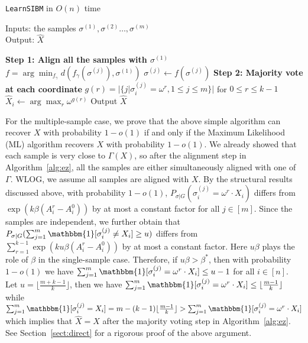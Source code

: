 \documentclass{article}
\begin{document}
\begin{center}
	\begin{minipage}{.55\textwidth}
		\begin{algorithm}[H]
			\caption{\texttt{LearnSIBM} in $O(n)$ time} \label{alg:ez}
			Inputs: the samples $\sigma^{(1)},\sigma^{(2)}\dots,\sigma^{(m)}$ \\
			Output: $\hat{X}$
			\begin{algorithmic}[1]
				\Statex \hspace*{-0.3in} 
				{\bf Step 1: Align all the samples with $\sigma^{(1)}$ }
				\State $f=\arg\min_{f_{\gamma}} d(f_{\gamma}(\sigma^{(j)}), \sigma^{(1)})$
				\State $\sigma^{(j)} \gets f(\sigma^{(j)})$
				\EndFor
				\Statex \hspace*{-0.3in}
				{\bf Step 2: Majority vote at each coordinate}
				\State $g(r) = |\{j | \sigma^{(j)}_i = \omega^r,1\leq j \leq m\}|$ for $ 0 \leq r \leq k-1$
				\State $\hat{X}_i \gets  \arg\max_r \omega^{g(r)}$
				\State {}
				\EndFor
				\State Output $\hat{X}$
			\end{algorithmic}
		\end{algorithm}
	\end{minipage}
\end{center}
For the multiple-sample case, we prove that the above simple algorithm can recover $X$ with probability $1-o(1)$ if and only if the Maximum Likelihood (ML) algorithm recovers $X$ with probability $1-o(1)$. We already showed that each sample is very close to $\Gamma(X)$, so after the alignment step in Algorithm~\ref{alg:ez}, all the samples are either simultaneously aligned with one of $\Gamma$. WLOG, we assume all samples are aligned with $X$.
By the structural results discussed above,
with probability $1-o(1)$, $P_{\sigma|G}(\sigma_i^{(j)} = \omega^r \cdot X_i)$ differs from
$\exp (k \beta (A^r_i-A^0_i))$ by at most a constant factor for all $j\in[m]$. Since the samples are independent, we further obtain that $P_{\sigma|G}(\sum_{j=1}^m\mathbbm{1}[\sigma_i^{(j)} \neq X_i]\ge u)$ differs from $\sum_{r=1}^{k-1} \exp (k u \beta (A^r_i-A^0_i))$
by at most a constant factor.
Here $u\beta$ plays the role of $\beta$ in the single-sample case.
Therefore, if $u\beta>\beta^\ast$, then with probability $1-o(1)$
we have $\sum_{j=1}^m\mathbbm{1}[\sigma_i^{(j)}= \omega^r \cdot X_i] \le u-1$ for all $i\in[n]$.
Let $u=\lfloor \frac{m+k-1}{k} \rfloor$,
then we have $\sum_{j=1}^m\mathbbm{1}[\sigma_i^{(j)} = \omega^r \cdot X_i] \le \lfloor \frac{m-1}{k} \rfloor $
while $\sum_{j=1}^m\mathbbm{1}[\sigma_i^{(j)} = X_i]
= m - (k-1)\lfloor \frac{m-1}{k} \rfloor > \sum_{j=1}^m\mathbbm{1}[\sigma_i^{(j)} = \omega^r \cdot X_i]$
which implies that $\hat{X}=X$ after the majority voting step in Algorithm~\ref{alg:ez}. See Section~\ref{sect:direct} for a rigorous proof of the above argument.
\end{document}
